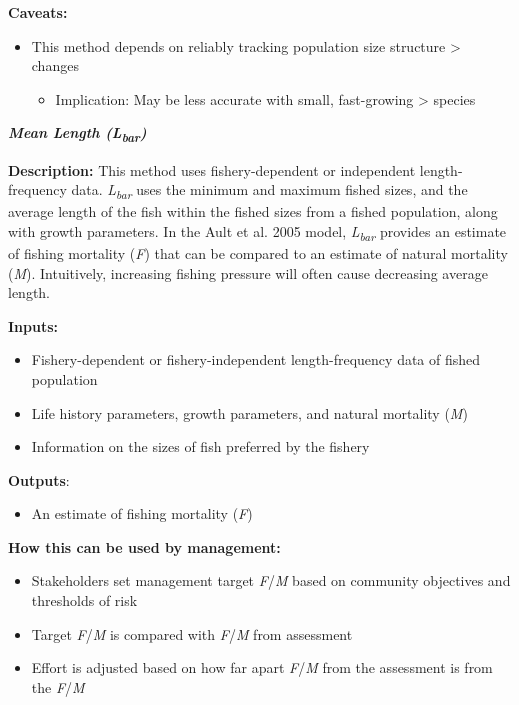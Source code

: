 \documentclass[]{book}
\providecommand{\tightlist}{%
  \setlength{\itemsep}{0pt}\setlength{\parskip}{0pt}}
\begin{document}
\textbf{Caveats:}

\begin{itemize}
\item
  This method depends on reliably tracking population size structure
  \textgreater{} changes

  \begin{itemize}
  \tightlist
  \item
    Implication: May be less accurate with small, fast-growing
    \textgreater{} species
  \end{itemize}
\end{itemize}

\textbf{\emph{Mean Length (L\textsubscript{bar})}}

\textbf{Description:} This method uses fishery-dependent or independent
length-frequency data. \emph{L\textsubscript{bar}} uses the minimum and
maximum fished sizes, and the average length of the fish within the
fished sizes from a fished population, along with growth parameters. In
the Ault et al. 2005 model, \emph{L\textsubscript{bar}} provides an
estimate of fishing mortality (\emph{F}) that can be compared to an
estimate of natural mortality (\emph{M}). Intuitively, increasing
fishing pressure will often cause decreasing average length.

\textbf{Inputs: }

\begin{itemize}
\item
  Fishery-dependent or fishery-independent length-frequency data of
  fished population
\item
  Life history parameters, growth parameters, and natural mortality
  (\emph{M})
\item
  Information on the sizes of fish preferred by the fishery
\end{itemize}

\textbf{Outputs}:

\begin{itemize}
\tightlist
\item
  An estimate of fishing mortality (\emph{F})
\end{itemize}

\textbf{How this can be used by management:}

\begin{itemize}
\item
  Stakeholders set management target \emph{F}/\emph{M} based on
  community objectives and thresholds of risk
\item
  Target \emph{F}/\emph{M} is compared with \emph{F}/\emph{M} from
  assessment
\item
  Effort is adjusted based on how far apart \emph{F}/\emph{M} from the
  assessment is from the \emph{F}/\emph{M}
\end{itemize}
\end{document}

